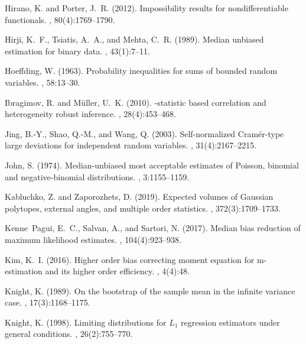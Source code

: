 \documentclass{article}
\numberwithin{myalgctr}{section}
\begin{document}
\begin{thebibliography}{}
Hirano, K. and Porter, J.~R. (2012).
\newblock Impossibility results for nondifferentiable functionals.
, 80(4):1769--1790.

Hirji, K.~F., Tsiatis, A.~A., and Mehta, C.~R. (1989).
\newblock Median unbiased estimation for binary data.
, 43(1):7--11.

Hoeffding, W. (1963).
\newblock Probability inequalities for sums of bounded random variables.
, 58:13--30.

Ibragimov, R. and M\"{u}ller, U.~K. (2010).
-statistic based correlation and heterogeneity robust inference.
, 28(4):453--468.

Jing, B.-Y., Shao, Q.-M., and Wang, Q. (2003).
\newblock Self-normalized {C}ram\'{e}r-type large deviations for independent
  random variables.
, 31(4):2167--2215.

John, S. (1974).
\newblock Median-unbiased most acceptable estimates of {P}oisson, binomial and
  negative-binomial distributions.
, 3:1155--1159.

Kabluchko, Z. and Zaporozhets, D. (2019).
\newblock Expected volumes of {G}aussian polytopes, external angles, and
  multiple order statistics.
, 372(3):1709--1733.

Kenne~Pagui, E.~C., Salvan, A., and Sartori, N. (2017).
\newblock Median bias reduction of maximum likelihood estimates.
, 104(4):923--938.

Kim, K.~I. (2016).
\newblock Higher order bias correcting moment equation for m-estimation and its
  higher order efficiency.
, 4(4):48.

Knight, K. (1989).
\newblock On the bootstrap of the sample mean in the infinite variance case.
, 17(3):1168--1175.

Knight, K. (1998).
\newblock Limiting distributions for {$L_1$} regression estimators under
  general conditions.
, 26(2):755--770.


\end{thebibliography}
\end{document}
